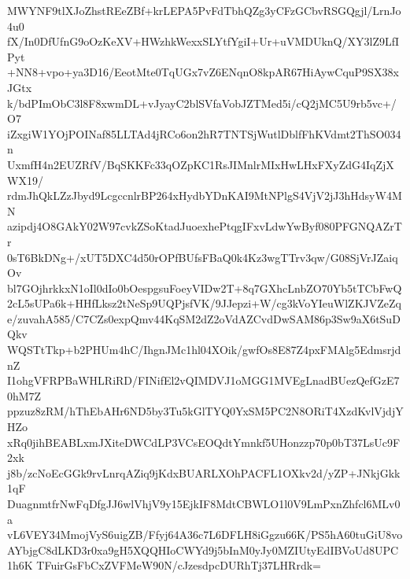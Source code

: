 MWYNF9tlXJoZhstREeZBf+krLEPA5PvFdTbhQZg3yCFzGCbvRSGQgjl/LrnJo4u0
fX/In0DfUfnG9oOzKeXV+HWzhkWexxSLYtfYgiI+Ur+uVMDUknQ/XY3lZ9LfIPyt
+NN8+vpo+ya3D16/EeotMte0TqUGx7vZ6ENqnO8kpAR67HiAywCquP9SX38xJGtx
k/bdPImObC3l8F8xwmDL+vJyayC2blSVfaVobJZTMed5i/cQ2jMC5U9rb5vc+/O7
iZxgiW1YOjPOINaf85LLTAd4jRCo6on2hR7TNTSjWutlDblfFhKVdmt2ThSO034n
UxmfH4n2EUZRfV/BqSKKFc33qOZpKC1RsJIMnlrMIxHwLHxFXyZdG4IqZjXWX19/
rdmJhQkLZzJbyd9LcgccnlrBP264xHydbYDnKAI9MtNPlgS4VjV2jJ3hHdsyW4MN
azipdj4O8GAkY02W97cvkZSoKtadJuoexhePtqgIFxvLdwYwByf080PFGNQAZrTr
0sT6BkDNg+/xUT5DXC4d50rOPfBUfsFBaQ0k4Kz3wgTTrv3qw/G08SjVrJZaiqOv
bl7GOjhrkkxN1oIl0dIo0bOespgsuFoeyVIDw2T+8q7GXhcLnbZO70Yb5tTCbFwQ
2cL5sUPa6k+HHfLksz2tNeSp9UQPjsfVK/9JJepzi+W/cg3kVoYIeuWlZKJVZeZq
e/zuvahA585/C7CZs0expQmv44KqSM2dZ2oVdAZCvdDwSAM86p3Sw9aX6tSuDQkv
WQSTtTkp+b2PHUm4hC/IhgnJMc1hl04XOik/gwfOs8E87Z4pxFMAlg5EdmsrjdnZ
I1ohgVFRPBaWHLRiRD/FINifEl2vQIMDVJ1oMGG1MVEgLnadBUezQefGzE70hM7Z
ppzuz8zRM/hThEbAHr6ND5by3Tu5kGlTYQ0YxSM5PC2N8ORiT4XzdKvlVjdjYHZo
xRq0jihBEABLxmJXiteDWCdLP3VCsEOQdtYmnkf5UHonzzp70p0bT37LsUc9F2xk
j8b/zcNoEcGGk9rvLnrqAZiq9jKdxBUARLXOhPACFL1OXkv2d/yZP+JNkjGkk1qF
DuagnmtfrNwFqDfgJJ6wlVhjV9y15EjkIF8MdtCBWLO1l0V9LmPxnZhfcl6MLv0a
vL6VEY34MmojVyS6uigZB/Ffyj64A36c7L6DFLH8iGgzu66K/PS5hA60tuGiU8vo
AYbjgC8dLKD3r0xa9gH5XQQHIoCWYd9j5bInM0yJy0MZIUtyEdIBVoUd8UPC1h6K
TFuirGsFbCxZVFMeW90N/cJzesdpcDURhTj37LHRrdk=
